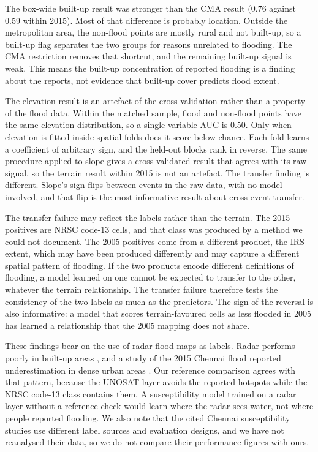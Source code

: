 \documentclass[conference]{IEEEtran}
\begin{document}
The box-wide built-up result was stronger than the CMA result (0.76 against 0.59 within 2015). Most of that difference is probably location. Outside the metropolitan area, the non-flood points are mostly rural and not built-up, so a built-up flag separates the two groups for reasons unrelated to flooding. The CMA restriction removes that shortcut, and the remaining built-up signal is weak. This means the built-up concentration of reported flooding is a finding about the reports, not evidence that built-up cover predicts flood extent.

The elevation result is an artefact of the cross-validation rather than a property of the flood data. Within the matched sample, flood and non-flood points have the same elevation distribution, so a single-variable AUC is 0.50. Only when elevation is fitted inside spatial folds does it score below chance. Each fold learns a coefficient of arbitrary sign, and the held-out blocks rank in reverse. The same procedure applied to slope gives a cross-validated result that agrees with its raw signal, so the terrain result within 2015 is not an artefact. The transfer finding is different. Slope's sign flips between events in the raw data, with no model involved, and that flip is the most informative result about cross-event transfer.

The transfer failure may reflect the labels rather than the terrain. The 2015 positives are NRSC code-13 cells, and that class was produced by a method we could not document. The 2005 positives come from a different product, the IRS extent, which may have been produced differently and may capture a different spatial pattern of flooding. If the two products encode different definitions of flooding, a model learned on one cannot be expected to transfer to the other, whatever the terrain relationship. The transfer failure therefore tests the consistency of the two labels as much as the predictors. The sign of the reversal is also informative: a model that scores terrain-favoured cells as less flooded in 2005 has learned a relationship that the 2005 mapping does not share.

These findings bear on the use of radar flood maps as labels. Radar performs poorly in built-up areas \cite{almehedi2025,wagner2026gfm}, and a study of the 2015 Chennai flood reported underestimation in dense urban areas \cite{vanama2019}. Our reference comparison agrees with that pattern, because the UNOSAT layer avoids the reported hotspots while the NRSC code-13 class contains them. A susceptibility model trained on a radar layer without a reference check would learn where the radar sees water, not where people reported flooding. We also note that the cited Chennai susceptibility studies use different label sources and evaluation designs, and we have not reanalysed their data, so we do not compare their performance figures with ours.
\end{document}

